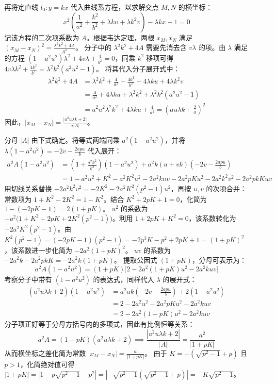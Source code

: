 \begin{solution}
再将定直线 $l_0: y = kx$ 代入曲线系方程，以求解交点 $M, N$ 的横坐标：
\[ x^2 \left( \frac{1}{a^2} + \frac{k^2}{b^2} + \lambda k u + \lambda k^2 v \right) - \lambda k x - 1 = 0 \]
记该方程的二次项系数为 $A$。根据韦达定理，两根 $x_M, x_N$ 满足 $(x_M - x_N)^2 = \frac{\lambda^2 k^2 + 4A}{A^2}$。
分子中的 $\lambda^2 k^2+4A$ 需要先消去含 $v\lambda$ 的项。由 $\lambda$ 满足的方程 $(1-a^2u^2)\lambda^2+4v\lambda+\frac{4}{b^2}=0$，同乘 $k^2$ 移项可得 $4v\lambda k^2+\frac{4k^2}{b^2}=\lambda^2 k^2(a^2u^2-1)$。
将其代入分子展开式中：
\begin{align*}
\lambda^2 k^2 + 4A &= \lambda^2 k^2 + \frac{4}{a^2} + \frac{4k^2}{b^2} + 4\lambda k u + 4\lambda k^2 v \\
&= \frac{4}{a^2} + 4\lambda k u + \lambda^2 k^2 + \lambda^2 k^2 (a^2 u^2 - 1) \\
&= a^2 u^2 \lambda^2 k^2 + 4\lambda k u + \frac{4}{a^2} = \left( au\lambda k + \frac{2}{a} \right)^2
\end{align*}
因此，$|x_M - x_N| = \frac{|a^2 u \lambda k + 2|}{a|A|}$。

分母 $|A|$ 由下式确定。将等式两端同乘 $a^2(1 - a^2 u^2)$，并将 $\lambda(1 - a^2 u^2) = -2v - \frac{2apu}{b}$ 代入展开：
\begin{align*}
a^2 A (1 - a^2 u^2) &= \left( 1 + \frac{a^2 k^2}{b^2} \right)(1 - a^2 u^2) + a^2 k (u + vk) \left( -2v - \frac{2apu}{b} \right) \\
&= 1 - a^2 u^2 + K^2 - a^2 K^2 u^2 - 2a^2 k u v - 2a^2 p K u^2 - 2a^2 k^2 v^2 - 2a^2 p k K u v
\end{align*}
用切线关系替换 $-2a^2 k^2 v^2 = -2K^2 - 2a^2 K^2 (p^2 - 1) u^2$，再按 $u, v$ 的次项合并：
常数项为 $1 + K^2 - 2K^2 = 1 - K^2$。结合 $K^2 + 2pK + 1 = 0$，化简为 $1 - (-2pK - 1) = 2(1 + pK)$。
$u^2$ 的系数为 $-a^2 \big( 1 + K^2 + 2pK + 2K^2(p^2 - 1) \big)$。利用 $1 + 2pK + K^2 = 0$，该系数转化为 $-2a^2 K^2 (p^2 - 1)$。由 $K^2 (p^2 - 1) = (-2pK - 1)(p^2 - 1) = -2p^3 K - p^2 + 2pK + 1 = (1 + pK)^2$，该系数进一步化简为 $-2a^2 (1 + pK)^2$。
$uv$ 的系数为 $-2a^2 k - 2a^2 p k K = -2a^2 k (1 + pK)$。
提取公因式 $(1 + pK)$，分母可表示为：
\[ a^2 A (1 - a^2 u^2) = (1 + pK) \big[ 2 - 2a^2(1 + pK)u^2 - 2a^2 k u v \big] \]
考察分子中带有 $(1 - a^2 u^2)$ 的表达式，同样代入 $\lambda$ 的展开式：
\begin{align*}
(a^2 u \lambda k + 2)(1 - a^2 u^2) &= a^2 u k \left( -2v - \frac{2apu}{b} \right) + 2(1 - a^2 u^2) \\
&= 2 - 2a^2 u^2 - 2a^2 p K u^2 - 2a^2 k u v \\
&= 2 - 2a^2 (1 + pK) u^2 - 2a^2 k u v
\end{align*}
分子项正好等于分母方括号内的多项式，因此有比例恒等关系：
\[ a^2 A = (1 + pK) (a^2 u \lambda k + 2) \implies \frac{|a^2 u \lambda k + 2|}{|A|} = \frac{a^2}{|1 + pK|} \]
从而横坐标之差化简为常数 $|x_M - x_N| = \frac{a}{|1 + pK|}$。
由于 $K = -(\sqrt{p^2 - 1} + p)$ 且 $p > 1$，化简绝对值可得 $|1 + pK| = |1 - p\sqrt{p^2 - 1} - p^2| = |- \sqrt{p^2 - 1}(\sqrt{p^2 - 1} + p)| = -K\sqrt{p^2 - 1}$。


\end{solution}
